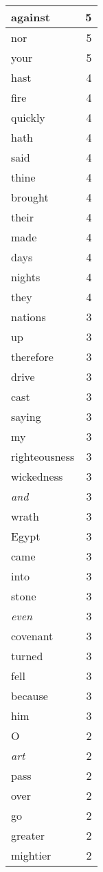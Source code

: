 \begin{center}
\begin{longtable}{l|r}
against & 5 \\ \hline
nor & 5 \\ \hline
your & 5 \\ \hline
hast & 4 \\ \hline
fire & 4 \\ \hline
quickly & 4 \\ \hline
hath & 4 \\ \hline
said & 4 \\ \hline
thine & 4 \\ \hline
brought & 4 \\ \hline
their & 4 \\ \hline
made & 4 \\ \hline
days & 4 \\ \hline
nights & 4 \\ \hline
they & 4 \\ \hline
nations & 3 \\ \hline
up & 3 \\ \hline
therefore & 3 \\ \hline
drive & 3 \\ \hline
cast & 3 \\ \hline
saying & 3 \\ \hline
my & 3 \\ \hline
righteousness & 3 \\ \hline
wickedness & 3 \\ \hline
\emph{and} & 3 \\ \hline
wrath & 3 \\ \hline
Egypt & 3 \\ \hline
came & 3 \\ \hline
into & 3 \\ \hline
stone & 3 \\ \hline
\emph{even} & 3 \\ \hline
covenant & 3 \\ \hline
turned & 3 \\ \hline
fell & 3 \\ \hline
because & 3 \\ \hline
him & 3 \\ \hline
O & 2 \\ \hline
\emph{art} & 2 \\ \hline
pass & 2 \\ \hline
over & 2 \\ \hline
go & 2 \\ \hline
greater & 2 \\ \hline
mightier & 2 \\ \hline

\end{longtable}
\end{center}
